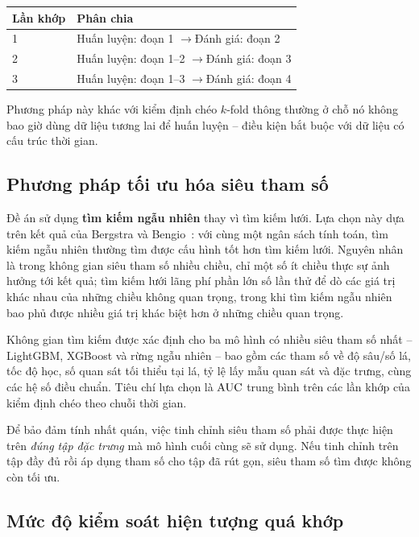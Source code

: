 \begin{center}
\begin{tabular}{@{}ll@{}}
\toprule
\textbf{Lần khớp} & \textbf{Phân chia} \\
\midrule
1 & Huấn luyện: đoạn 1 \quad$\rightarrow$\quad Đánh giá: đoạn 2 \\
2 & Huấn luyện: đoạn 1--2 \quad$\rightarrow$\quad Đánh giá: đoạn 3 \\
3 & Huấn luyện: đoạn 1--3 \quad$\rightarrow$\quad Đánh giá: đoạn 4 \\
\bottomrule
\end{tabular}
\end{center}

Phương pháp này khác với kiểm định chéo $k$-fold thông thường ở chỗ nó không bao
giờ dùng dữ liệu tương lai để huấn luyện -- điều kiện bắt buộc với dữ liệu có cấu
trúc thời gian.

\subsection{Phương pháp tối ưu hóa siêu tham số}
\label{subsec:toi-uu-sieu-tham-so}

Đề án sử dụng \textbf{tìm kiếm ngẫu nhiên} thay vì tìm kiếm lưới. Lựa chọn này
dựa trên kết quả của Bergstra và Bengio~\cite{bergstra2012}: với cùng một ngân
sách tính toán, tìm kiếm ngẫu nhiên thường tìm được cấu hình tốt hơn tìm kiếm
lưới. Nguyên nhân là trong không gian siêu tham số nhiều chiều, chỉ một số ít
chiều thực sự ảnh hưởng tới kết quả; tìm kiếm lưới lãng phí phần lớn số lần thử
để dò các giá trị khác nhau của những chiều không quan trọng, trong khi tìm kiếm
ngẫu nhiên bao phủ được nhiều giá trị khác biệt hơn ở những chiều quan trọng.

Không gian tìm kiếm được xác định cho ba mô hình có nhiều siêu tham số nhất --
LightGBM, XGBoost và rừng ngẫu nhiên -- bao gồm các tham số về độ sâu/số lá, tốc
độ học, số quan sát tối thiểu tại lá, tỷ lệ lấy mẫu quan sát và đặc trưng, cùng
các hệ số điều chuẩn. Tiêu chí lựa chọn là $\mathrm{AUC}$ trung bình trên các lần khớp
của kiểm định chéo theo chuỗi thời gian.

Để bảo đảm tính nhất quán, việc tinh chỉnh siêu tham số phải được thực hiện trên
\textit{đúng tập đặc trưng} mà mô hình cuối cùng sẽ sử dụng. Nếu
tinh chỉnh trên tập đầy đủ rồi áp dụng tham số cho tập đã rút gọn, siêu tham số
tìm được không còn tối ưu.

\subsection{Mức độ kiểm soát hiện tượng quá khớp}
\label{subsec:kiem-soat-qua-khop}

